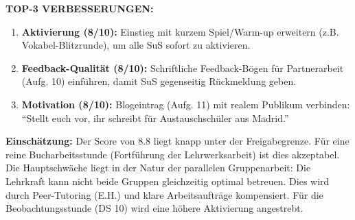 \documentclass[11pt,a4paper]{article}
\begin{document}
\begin{scorebox}
\vspace{1em}
\textbf{TOP-3 VERBESSERUNGEN:}
\begin{enumerate}
    \item \textbf{Aktivierung (8/10):} Einstieg mit kurzem Spiel/Warm-up erweitern (z.B. Vokabel-Blitzrunde), um alle SuS sofort zu aktivieren.
    \item \textbf{Feedback-Qualität (8/10):} Schriftliche Feedback-Bögen für Partnerarbeit (Aufg. 10) einführen, damit SuS gegenseitig Rückmeldung geben.
    \item \textbf{Motivation (8/10):} Blogeintrag (Aufg. 11) mit realem Publikum verbinden: ``Stellt euch vor, ihr schreibt für Austauschschüler aus Madrid.''
\end{enumerate}

\vspace{1em}
\textbf{Einschätzung:}
Der Score von 8.8 liegt knapp unter der Freigabegrenze. Für eine reine Bucharbeitsstunde (Fortführung der Lehrwerksarbeit) ist dies akzeptabel. Die Hauptschwäche liegt in der Natur der parallelen Gruppenarbeit: Die Lehrkraft kann nicht beide Gruppen gleichzeitig optimal betreuen. Dies wird durch Peer-Tutoring (E.H.) und klare Arbeitsaufträge kompensiert. Für die Beobachtungsstunde (DS 10) wird eine höhere Aktivierung angestrebt.

\end{scorebox}
\end{document}
